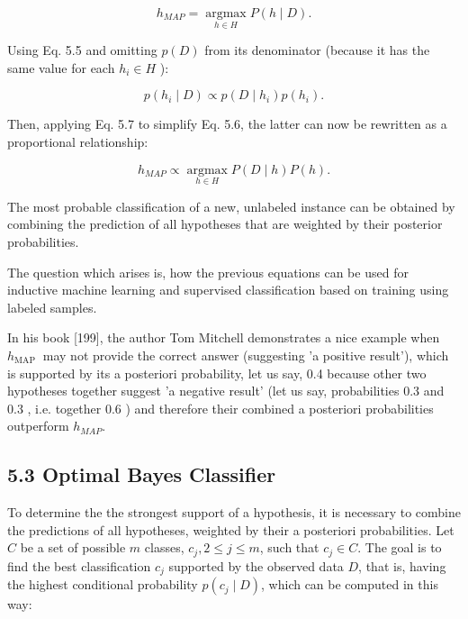 \documentclass[10pt]{book}
\begin{document}
\begin{equation*}
h_{M A P}=\underset{h \in H}{\operatorname{argmax}} P(h \mid D) . \tag{5.6}
\end{equation*}


Using Eq. 5.5 and omitting $p(D)$ from its denominator (because it has the same value for each $h_{i} \in H$ ):


\begin{equation*}
p\left(h_{i} \mid D\right) \propto p\left(D \mid h_{i}\right) p\left(h_{i}\right) . \tag{5.7}
\end{equation*}


Then, applying Eq. 5.7 to simplify Eq. 5.6, the latter can now be rewritten as a proportional relationship:


\begin{equation*}
h_{M A P} \propto \underset{h \in H}{\operatorname{argmax}} P(D \mid h) P(h) . \tag{5.8}
\end{equation*}


The most probable classification of a new, unlabeled instance can be obtained by combining the prediction of all hypotheses that are weighted by their posterior probabilities.

The question which arises is, how the previous equations can be used for inductive machine learning and supervised classification based on training using labeled samples.

In his book [199], the author Tom Mitchell demonstrates a nice example when $h_{\text {MAP }}$ may not provide the correct answer (suggesting 'a positive result'), which is supported by its a posteriori probability, let us say, 0.4 because other two hypotheses together suggest 'a negative result' (let us say, probabilities 0.3 and 0.3 , i.e. together 0.6 ) and therefore their combined a posteriori probabilities outperform $h_{M A P}$.

\subsection*{5.3 Optimal Bayes Classifier}
To determine the the strongest support of a hypothesis, it is necessary to combine the predictions of all hypotheses, weighted by their a posteriori probabilities. Let $C$ be a set of possible $m$ classes, $c_{j}, 2 \leq j \leq m$, such that $c_{j} \in C$. The goal is to find the best classification $c_{j}$ supported by the observed data $D$, that is, having the highest conditional probability $p\left(c_{j} \mid D\right)$, which can be computed in this way:
\end{document}
